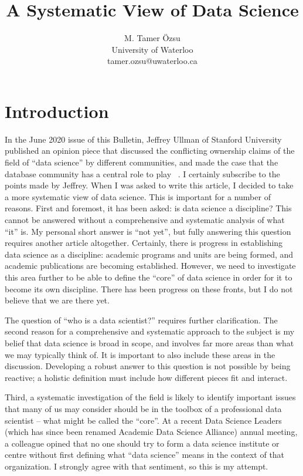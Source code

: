 \documentclass[11pt]{article}
\begin{document}
\title{A Systematic View of Data Science}
\author{M. Tamer \"{O}zsu\\University of Waterloo\\tamer.ozsu@uwaterloo.ca}

\section{Introduction}
In the June 2020 issue of this Bulletin, Jeffrey Ullman of Stanford University published an opinion piece that discussed the conflicting ownership claims of the field of ``data science'' by different communities, and made the case that the database community has a central role to play ~\cite{Ullman:2020aa}. I certainly subscribe to the points made by Jeffrey. When I was asked to write this article, I decided to take a more systematic view of data science. This is important for a number of reasons. First and foremost, it has been asked: is data science a discipline? This cannot be answered without a comprehensive and systematic analysis of what ``it'' is. My personal short answer is ``not yet'', but fully answering this question requires another article altogether. Certainly, there is progress in establishing data science as a discipline: academic programs and units are being formed, and academic publications are becoming established.  However, we need to investigate this area further to be able to define the ``core'' of data science in order for it to become its own discipline. There has been progress on these fronts, but I do not believe that we are there yet. 
 
The question of ``who is a data scientist?'' requires further clarification. The second reason for a comprehensive and systematic approach to the subject is my belief that data science is broad in scope, and involves far more areas than what we may typically think of. It is important to also include these areas in the discussion. Developing a robust answer to this question is not possible by being reactive; a holistic definition must include how different pieces fit and interact. 

Third, a systematic investigation of the field is likely to identify important issues that many of us may consider should be in the toolbox of a professional data scientist -- what might be called the ``core''. At a recent Data Science Leaders  (which has since been renamed Academic Data Science Alliance) annual meeting, a colleague opined that no one should try to form a data science institute or centre without first defining what ``data science'' means in the context of that organization. I strongly agree with that sentiment, so this is my attempt.
\end{document}
